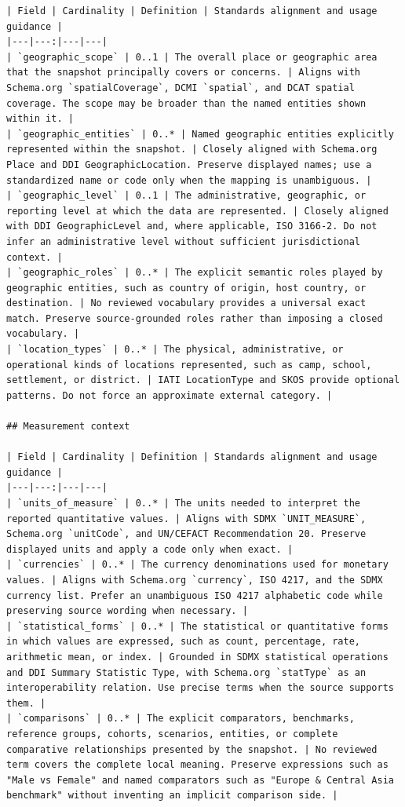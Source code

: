 \documentclass{article}
\begin{document}
\begin{lstlisting}
| Field | Cardinality | Definition | Standards alignment and usage guidance |
|---|---:|---|---|
| `geographic_scope` | 0..1 | The overall place or geographic area that the snapshot principally covers or concerns. | Aligns with Schema.org `spatialCoverage`, DCMI `spatial`, and DCAT spatial coverage. The scope may be broader than the named entities shown within it. |
| `geographic_entities` | 0..* | Named geographic entities explicitly represented within the snapshot. | Closely aligned with Schema.org Place and DDI GeographicLocation. Preserve displayed names; use a standardized name or code only when the mapping is unambiguous. |
| `geographic_level` | 0..1 | The administrative, geographic, or reporting level at which the data are represented. | Closely aligned with DDI GeographicLevel and, where applicable, ISO 3166-2. Do not infer an administrative level without sufficient jurisdictional context. |
| `geographic_roles` | 0..* | The explicit semantic roles played by geographic entities, such as country of origin, host country, or destination. | No reviewed vocabulary provides a universal exact match. Preserve source-grounded roles rather than imposing a closed vocabulary. |
| `location_types` | 0..* | The physical, administrative, or operational kinds of locations represented, such as camp, school, settlement, or district. | IATI LocationType and SKOS provide optional patterns. Do not force an approximate external category. |

## Measurement context

| Field | Cardinality | Definition | Standards alignment and usage guidance |
|---|---:|---|---|
| `units_of_measure` | 0..* | The units needed to interpret the reported quantitative values. | Aligns with SDMX `UNIT_MEASURE`, Schema.org `unitCode`, and UN/CEFACT Recommendation 20. Preserve displayed units and apply a code only when exact. |
| `currencies` | 0..* | The currency denominations used for monetary values. | Aligns with Schema.org `currency`, ISO 4217, and the SDMX currency list. Prefer an unambiguous ISO 4217 alphabetic code while preserving source wording when necessary. |
| `statistical_forms` | 0..* | The statistical or quantitative forms in which values are expressed, such as count, percentage, rate, arithmetic mean, or index. | Grounded in SDMX statistical operations and DDI Summary Statistic Type, with Schema.org `statType` as an interoperability relation. Use precise terms when the source supports them. |
| `comparisons` | 0..* | The explicit comparators, benchmarks, reference groups, cohorts, scenarios, entities, or complete comparative relationships presented by the snapshot. | No reviewed term covers the complete local meaning. Preserve expressions such as "Male vs Female" and named comparators such as "Europe & Central Asia benchmark" without inventing an implicit comparison side. |


\end{lstlisting}
\end{document}
